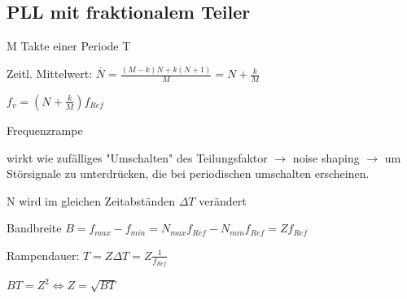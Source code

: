 \subsection{PLL mit fraktionalem Teiler}



\begin{pitemize}
    \item M Takte einer Periode T
    \item Zeitl. Mittelwert: $\bar{N} = \frac{(M - k)N + k(N + 1)}{M} = N + \frac{k}{M}$
    \item $f_v = (N + \frac{k}{M}) f_{Ref}$
\end{pitemize}          

Frequenzrampe


wirkt wie zufälliges "Umschalten" des Teilungsfaktor $\rightarrow$ noise shaping $\rightarrow$ um Störsignale zu unterdrücken, die bei periodischen umschalten erscheinen.


\begin{pitemize}
    \item N wird im gleichen Zeitabständen $\Delta T$ verändert
    \item Bandbreite $B = f_{max} - f_{min} = N_{max} f_{Ref} - N_{min} f_{Ref} = Zf_{Ref} $
    \item Rampendauer: $T = Z \Delta T = Z \frac{1}{f_{Ref}}$
    \item $BT = Z^2 \Leftrightarrow Z = \sqrt{BT}$
\end{pitemize}




